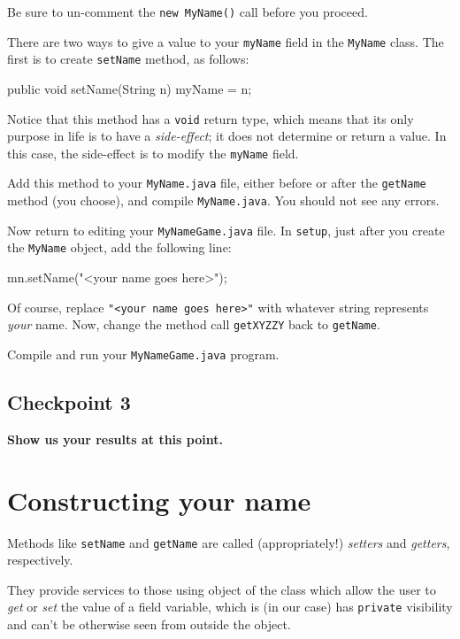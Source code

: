 \documentclass[12pt]{article}
\newenvironment{qv}%
  {\quote
   \verbatim}%
  {\endverbatim
   \endquote}
\newcommand{\code}{\texttt}
\begin{document}
Be sure to un-comment the \code{new MyName()} call before you proceed.

There are two ways to give a value to your \code{myName} field
in the \code{MyName} class.
The first is to create \code{setName} method, as follows:

\begin{qv}
public void setName(String n) {
  myName = n;
}
\end{qv}

Notice that this method has a \code{void} return type, which means
that its only purpose in life is to have a \emph{side-effect}; it does
not determine or return a value.  In this case, the side-effect is to
modify the \code{myName} field.

Add this method to your \code{MyName.java} file, either before or
after the \code{getName} method (you choose), and compile 
\code{MyName.java}.  You should not see any errors.

Now return to editing your \code{MyNameGame.java} file.  In
\code{setup}, just after you create the \code{MyName} object, add the
following line:

\begin{qv}
mn.setName("<your name goes here>");
\end{qv}

Of course, replace \code{"<your name goes here>"} with whatever string
represents \emph{your} name.  Now, change the method call
\code{getXYZZY} back to \code{getName}.

Compile and run your \code{MyNameGame.java} program.

\subsection*{Checkpoint 3}
{\bf
Show us your results at this point.
}

\section*{Constructing your name}

Methods like \code{setName} and \code{getName} are called
(appropriately!) {\em setters} and {\em getters}, respectively.

They provide services to those using object of the class which allow
the user to {\em get} or {\em set} the value of a field variable,
which is (in our case) has \code{private} visibility and can't be
otherwise seen from outside the object.
\end{document}
